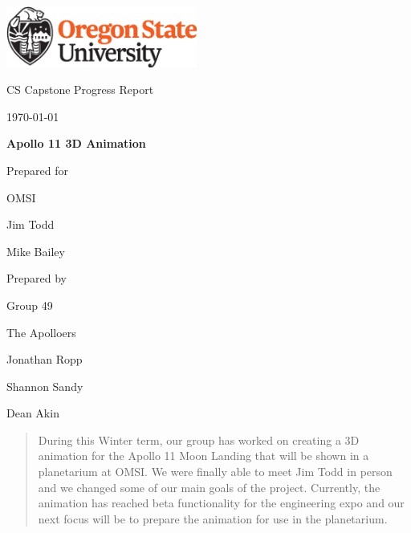 \documentclass[onecolumn, draftclsnofoot,10pt, compsoc]{IEEEtran}
\def \CapstoneTeamName{		    The Apolloers}
\def \CapstoneTeamNumber{		49}
\def \GroupMemberOne{			Jonathan Ropp}
\def \GroupMemberTwo{			Shannon Sandy}
\def \GroupMemberThree{			Dean Akin}
\def \CapstoneProjectName{		Apollo 11 3D Animation}
\def \CapstoneSponsorCompany{	OMSI}
\def \CapstoneSponsorPersona{	Jim Todd}
\def \CapstoneSponsorPersonb{	Mike Bailey}
\def \DocType{		
				Progress Report
				}
\newcommand{\NameSigPair}[1]{\par
\makebox[2.75in][r]{#1} \hfil 	\makebox[3.25in]{\makebox[2.25in]{\hrulefill} \hfill		\makebox[.75in]{\hrulefill}}
\par\vspace{-12pt} \textit{\tiny\noindent
\makebox[2.75in]{} \hfil		\makebox[3.25in]{\makebox[2.25in][r]{Signature} \hfill	\makebox[.75in][r]{Date}}}}
\renewcommand{\NameSigPair}[1]{#1}
\begin{document}
\begin{titlepage}
    \begin{singlespace}
        \hfill 
        \includegraphics[height=2cm]{OSU_horizontal_2C_O_over_B.eps}   
        \par\vspace{.2in}
        \centering
        \scshape{
            \huge CS Capstone \DocType \par
            {\large\today}\par
            \vspace{.5in}
            \textbf{\Huge\CapstoneProjectName}\par
            \vfill
            {\large Prepared for}\par
            \Huge \CapstoneSponsorCompany\par
            \vspace{5pt}
            {\Large\NameSigPair{\CapstoneSponsorPersona}\par}
            {\Large\NameSigPair{\CapstoneSponsorPersonb}\par}
            {\large Prepared by }\par
            Group\CapstoneTeamNumber\par
            \CapstoneTeamName\par 
            \vspace{5pt}
            {\Large
                \NameSigPair{\GroupMemberOne}\par
                \NameSigPair{\GroupMemberTwo}\par
                \NameSigPair{\GroupMemberThree}\par
            }
            \vspace{20pt}
        }
        \begin{abstract}
    
During this Winter term, our group has worked on creating a 3D animation for the Apollo 11 Moon Landing that will be shown in a planetarium at OMSI. We were finally able to meet Jim Todd in person and we changed some of our main goals of the project. Currently, the animation has reached beta functionality for the engineering expo and our next focus will be to prepare the animation for use in the planetarium. 

        \end{abstract}     
    \end{singlespace}
\end{titlepage}
\newpage
{}
\tableofcontents
\end{document}
